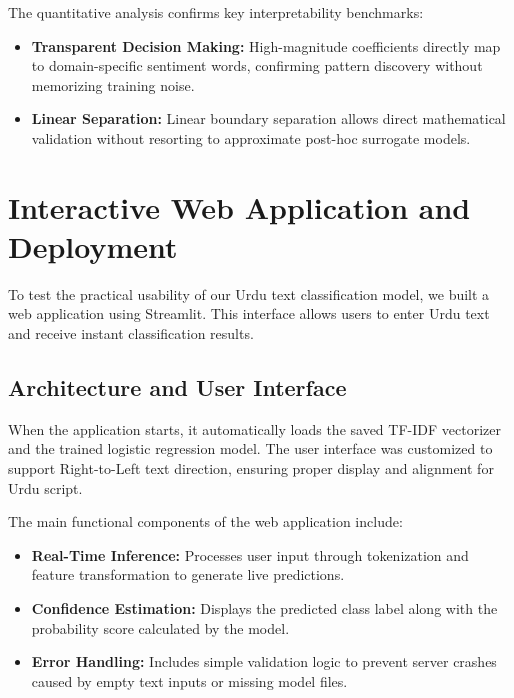 \documentclass[11pt,a4paper]{article}
\begin{document}
The quantitative analysis confirms key interpretability benchmarks:
\begin{itemize}
    \item \textbf{Transparent Decision Making:} High-magnitude coefficients directly map to domain-specific sentiment words, confirming pattern discovery without memorizing training noise.
    \item \textbf{Linear Separation:} Linear boundary separation allows direct mathematical validation without resorting to approximate post-hoc surrogate models.
\end{itemize}

\section{Interactive Web Application and Deployment}
To test the practical usability of our Urdu text classification model, we built a web application using Streamlit. This interface allows users to enter Urdu text and receive instant classification results.

\subsection{Architecture and User Interface}
When the application starts, it automatically loads the saved TF-IDF vectorizer and the trained logistic regression model. The user interface was customized to support Right-to-Left text direction, ensuring proper display and alignment for Urdu script.

The main functional components of the web application include:
\begin{itemize}
\item \textbf{Real-Time Inference:} Processes user input through tokenization and feature transformation to generate live predictions.
\item \textbf{Confidence Estimation:} Displays the predicted class label along with the probability score calculated by the model.
\item \textbf{Error Handling:} Includes simple validation logic to prevent server crashes caused by empty text inputs or missing model files.
\end{itemize}
\end{document}

